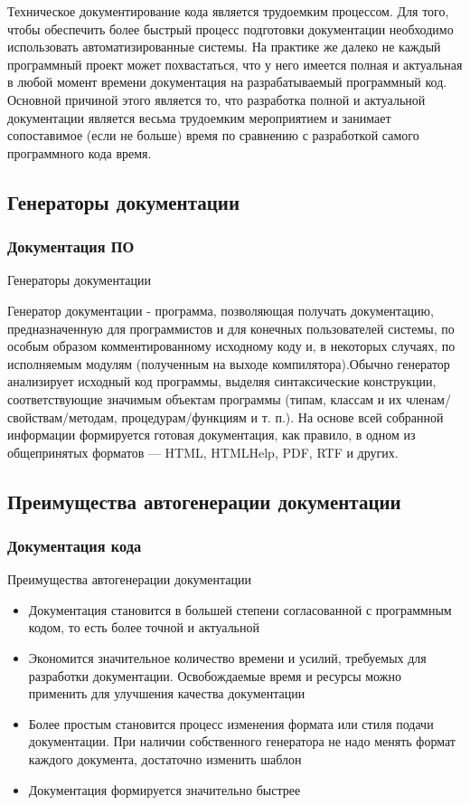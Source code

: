\documentclass{../industrial-development}
\begin{document}
\lecturenotes
Техническое документирование кода является трудоемким процессом.  Для того, чтобы обеспечить более быстрый процесс подготовки документации необходимо использовать автоматизированные системы.
На практике же далеко не каждый программный проект может похвастаться, что у него имеется полная и актуальная в любой момент времени документация на разрабатываемый программный код.
Основной причиной этого является то, что разработка полной и актуальной документации является весьма трудоемким мероприятием и занимает сопоставимое (если не больше) время по сравнению с разработкой самого программного кода время.

\subsection{Генераторы документации}
\begin{frame} \frametitle{Документация ПО}
  \begin{block}{Генераторы документации}
  \end{block}
Генератор документации -  программа, позволяющая получать документацию, предназначенную для программистов и для конечных пользователей системы, по особым образом комментированному исходному коду и, в некоторых случаях, по исполняемым модулям (полученным на выходе компилятора).Обычно генератор анализирует исходный код программы, выделяя синтаксические конструкции, соответствующие значимым объектам программы (типам, классам и их членам/свойствам/методам, процедурам/функциям и т. п.).  На основе всей собранной информации формируется готовая документация, как правило, в одном из общепринятых форматов — HTML, HTMLHelp, PDF, RTF и других. 
\end{frame}
\lecturenotes

\subsection{Преимущества автогенерации документации}
\begin{frame} \frametitle{Документация кода}
  \begin{block}{Преимущества автогенерации документации}
  \end{block}
  \begin{itemize}
  \item Документация становится в большей степени согласованной с программным кодом, то есть более точной и актуальной
  \item Экономится значительное количество времени и усилий, требуемых для разработки документации. Освобождаемые время и ресурсы можно применить для улучшения качества документации
  \item Более простым становится процесс изменения формата или стиля подачи документации. При наличии собственного генератора не надо менять формат каждого документа, достаточно изменить шаблон
  \item Документация формируется значительно быстрее
  \end{itemize}
\end{frame}
\lecturenotes
\end{document}
